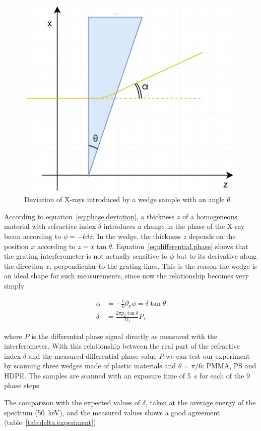 \begin{figure}[htb]
    \centering
    \includegraphics[width=.5\textwidth]{gfx/wedge-deviation.png}
    \caption{Deviation of X-rays introduced by a wedge sample with an angle
    $\theta$.}
    \label{fig:wedge.deviation}
\end{figure}

According to equation~\eqref{eq:phase.deviation}, a thickness $z$ of a
homogeneous material with refractive index $\delta$ introduces a change in
the phase of the X-ray beam according to $\phi = -k\delta z$. In the wedge,
the thickness $z$ depends on the position $x$ according to $z = x\tan
\theta$. Equation~\eqref{eq:differential.phase} shows that the grating
interferometer is not actually sensitive to $\phi$ but to its derivative
along the direction $x$, perpendicular to the grating lines. This is the
reason the wedge is an ideal shape for such measurements, since now the
relationship becomes very simply

\begin{align}
    \alpha &= -\frac{1}{k}\partial_x\phi = \delta\tan\theta\\
    \delta &= \frac{2 \pi p_2 \tan \theta}{D_1}P,
    \label{eq:measuring.differential.phase}
\end{align}

where $P$ is the differential phase signal directly as measured with the
interferometer. With this relationship between the real part of the
refractive index $\delta$ and the measured differential phase value $P$ we
can test our experiment by scanning three wedges made of plastic materials
and $\theta = \pi/6$: \ac{PMMA}, \ac{PS} and \ac{HDPE}.
The samples are scanned with an exposure time of \SI{5}{\second} for each of
the \num{9} phase steps.                 

The comparison with the expected values of $\delta$, taken at the average
energy of the spectrum (\SI{50}{\kilo\eV}), and the measured values shows a
good agreement (table~\ref{tab:delta.experiment})

